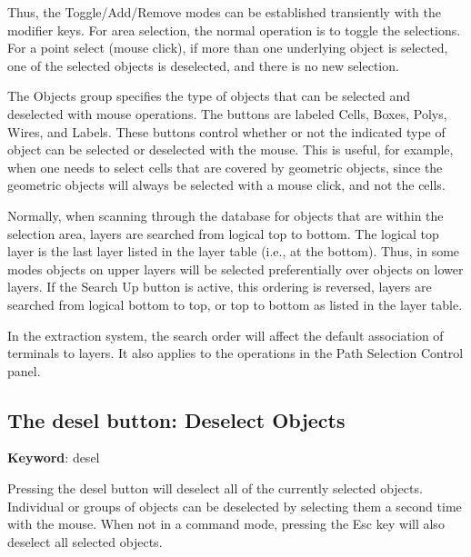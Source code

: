 Thus, the {\et Toggle}/{\et Add}/{\et Remove} modes can be established
transiently with the modifier keys.  For area selection, the normal
operation is to toggle the selections.  For a point select (mouse
click), if more than one underlying object is selected, one of the
selected objects is deselected, and there is no new selection.

The {\cb Objects} group specifies the type of objects that can be
selected and deselected with mouse operations.  The buttons are
labeled {\cb Cells}, {\cb Boxes}, {\cb Polys}, {\cb Wires}, and {\cb
Labels}.  These buttons control whether or not the indicated type of
object can be selected or deselected with the mouse.  This is useful,
for example, when one needs to select cells that are covered by
geometric objects, since the geometric objects will always be selected
with a mouse click, and not the cells.

Normally, when scanning through the database for objects that are
within the selection area, layers are searched from logical top to
bottom.  The logical top layer is the last layer listed in the layer
table (i.e., at the bottom).  Thus, in some modes objects on upper
layers will be selected preferentially over objects on lower layers. 
If the {\cb Search Up} button is active, this ordering is reversed,
layers are searched from logical bottom to top, or top to bottom as
listed in the layer table.

In the extraction system, the search order will affect the default
association of terminals to layers.  It also applies to the operations
in the {\cb Path Selection Control} panel.


\subsection{The {\cb desel} button: Deselect Objects}

{\bf Keyword}: {\vt desel}

Pressing the {\cb desel} button will deselect all of the currently
selected objects.  Individual or groups of objects can be deselected
by selecting them a second time with the mouse.  When not in a command
mode, pressing the {\kb Esc} key will also deselect all selected
objects.


